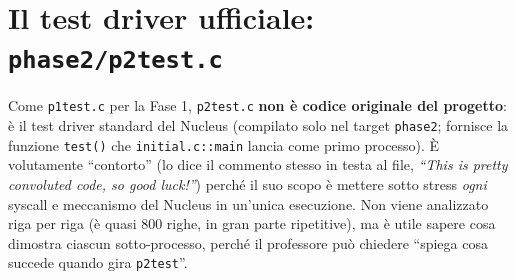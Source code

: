 \documentclass[11pt,a4paper]{article}
\newcommand{\code}[1]{\texttt{#1}}
\begin{document}
\section{Il test driver ufficiale: \code{phase2/p2test.c}}

Come \code{p1test.c} per la Fase 1, \code{p2test.c} \textbf{non è codice
originale del progetto}: è il test driver standard del Nucleus (compilato
solo nel target \code{phase2}; fornisce la funzione \code{test()} che
\code{initial.c::main} lancia come primo processo). È volutamente
``contorto'' (lo dice il commento stesso in testa al file, \emph{``This is
pretty convoluted code, so good luck!''}) perché il suo scopo è mettere
sotto stress \emph{ogni} syscall e meccanismo del Nucleus in un'unica
esecuzione. Non viene analizzato riga per riga (è quasi 800 righe,
in gran parte ripetitive), ma è utile sapere cosa dimostra ciascun
sotto-processo, perché il professore può chiedere ``spiega cosa succede
quando gira \code{p2test}''.
\end{document}
